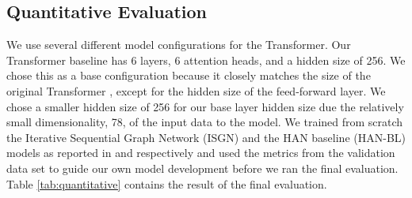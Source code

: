 \subsection{Quantitative Evaluation}
We use several different model configurations for the Transformer. Our Transformer baseline has 6 layers, 6 attention heads, and a hidden size of 256. We chose this as a base configuration because it closely matches the size of the original Transformer \cite{vaswani2017attention}, except for the hidden size of the feed-forward layer. We chose a smaller hidden size of 256 for our base layer hidden size due the relatively small dimensionality, 78, of the input data to the model. We trained from scratch the Iterative Sequential Graph Network (ISGN) and the HAN baseline (HAN-BL) models as reported in \cite{jeong2019graph} and \cite{jeong2019virtuosonet} respectively and used the metrics from the validation data set to guide our own model development before we ran the final evaluation. Table \ref{tab:quantitative} contains the result of the final evaluation.


\newcommand{\nep}{$N_{id}$}
\newcommand{\mn}{$M$} %
\newcommand{\nl}{$L$} %
\newcommand{\dhid}{$d_{hid}$} %
\newcommand{\drop}{$D$} %
\newcommand{\lr}{$LR$} %
\newcommand{\clip}{$C$} %
\newcommand{\nh}{$H$} %

\newcommand{\temp}{$t$}
\newcommand{\vel}{$v$}
\newcommand{\dev}{$d$}
\newcommand{\art}{$a$}
\newcommand{\ped}{$p$}



